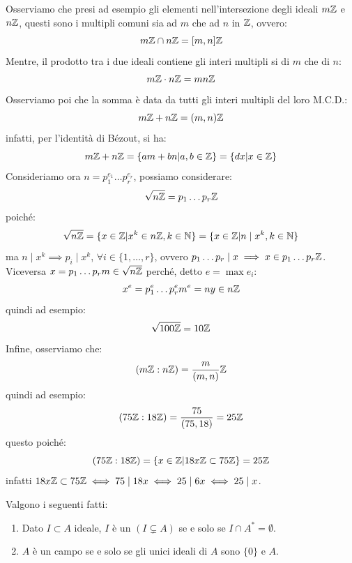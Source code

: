 \documentclass[11pt]{scrartcl}
\begin{document}
\begin{example}
    Osserviamo che presi ad esempio gli elementi nell'intersezione degli ideali $m\mathbb Z$ e $n\mathbb Z$, questi sono i multipli comuni sia ad $m$ che ad $n$ in $\mathbb Z$, ovvero:
        \[ m\mathbb Z \cap n\mathbb Z = [m,n]\mathbb Z
            \]
    Mentre, il prodotto tra i due ideali contiene gli interi multipli si di $m$ che di $n$:
        \[ m\mathbb Z \cdot n\mathbb Z = mn\mathbb Z
            \]
    Osserviamo poi che la somma è data da tutti gli interi multipli del loro M.C.D.:
        \[ m\mathbb Z + n\mathbb Z = (m,n)\mathbb Z
            \]
    infatti, per l'identità di Bézout, si ha:
        \[ m\mathbb Z + n\mathbb Z = \{am + bn | a,b \in \mathbb Z\} = \{dx | x \in \mathbb Z\}
            \]
    Consideriamo ora $n = p_1^{e_1} \ldots p_r^{e_r}$, possiamo considerare:
        \[ \sqrt{n\mathbb Z} = p_1 \ldots p_r\mathbb Z
            \]
    poiché:
        \[ \sqrt{n\mathbb Z} = \{x \in \mathbb Z | x^k \in n\mathbb Z, k \in \mathbb N\} = \{x \in \mathbb Z | n \mid x^k, k \in \mathbb N\}
            \]
    ma $n \mid x^k \implies p_i \mid x^k$, $\forall i \in \{1,\ldots,r\}$, ovvero $p_1 \ldots p_r \mid x \implies x \in p_1\ldots p_r\mathbb Z$.
    Viceversa $x = p_1 \ldots p_r m \in \sqrt{n\mathbb Z}$ perché, detto $e = \max e_i$:
        \[ x^e = p_1^e \ldots p_r^e m^e = ny \in n\mathbb Z
            \]
    quindi ad esempio:
        \[ \sqrt{100\mathbb Z} = 10\mathbb Z
            \]
    Infine, osserviamo che:
        \[ (m\mathbb Z : n\mathbb Z) = \frac{m}{(m,n)}\mathbb Z
            \]
    quindi ad esempio:
        \[ (75\mathbb Z : 18\mathbb Z) = \frac{75}{(75,18)} = 25\mathbb Z
            \]
    questo poiché:
        \[ (75\mathbb Z : 18\mathbb Z) = \{x \in \mathbb Z | 18x \mathbb Z \subset 75\mathbb Z\} = 25\mathbb Z
            \]
    infatti $18x \mathbb Z \subset 75\mathbb Z \iff 75 \mid 18x \iff 25 \mid 6x \iff 25 \mid x$.
\end{example}

\newpage
\begin{proposition}
\label{2.26}
Valgono i seguenti fatti:
\begin{enumerate}[(1)]
    \item Dato $I \subset A$ ideale, $I$ è un  $(I \subsetneq A)$ se e solo se $I \cap A^* = \emptyset$.
    \item $A$ è un campo se e solo se gli unici ideali di $A$ sono $\{0\}$ e $A$.
\end{enumerate}
\end{proposition}
\end{document}
